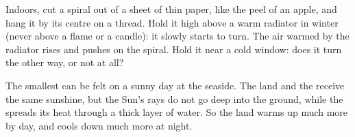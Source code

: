\begin{inthelab}
Indoors, cut a spiral out of a sheet of thin paper, like the peel of an
apple, and hang it by its centre on a thread. Hold it high above a warm
radiator in winter (never above a flame or a candle): it slowly starts to
turn. The air warmed by the radiator rises and pushes on the spiral. Hold
it near a cold window: does it turn the other way, or not at all?
\end{inthelab}

The smallest  can be felt on a sunny day at the seaside.
The land and the  receive the same sunshine, but the Sun's rays do
not go deep into the ground, while the  spreads its heat through a
thick layer of water. So the land warms up much more by day, and cools
down much more at night.

